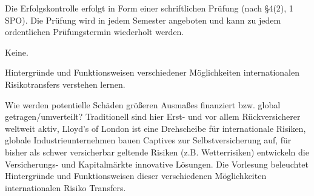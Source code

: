 \begin{course}

\setdoclanguagegerman
{}



\coursehead


\label{cour_5121.dp_997}


\begin{styleenv}
\begin{assessment}
Die Erfolgskontrolle erfolgt in Form einer schriftlichen Prüfung (nach §4(2), 1 SPO). Die Prüfung wird in jedem Semester angeboten und kann zu jedem ordentlichen Prüfungstermin wiederholt werden.


\end{assessment}

\begin{conditions}Keine.\end{conditions}


\end{styleenv}

\begin{learningoutcomes}
Hintergründe und Funktionsweisen verschiedener Möglichkeiten internationalen Risikotransfers verstehen lernen.


\end{learningoutcomes}

\begin{content}
Wie werden potentielle Schäden größeren Ausmaßes finanziert bzw. global getragen/umverteilt? Traditionell sind hier Erst- und vor allem Rückversicherer weltweit aktiv, Lloyd's of London ist eine Drehscheibe für internationale Risiken, globale Industrieunternehmen bauen Captives zur Selbstversicherung auf, für bisher als schwer versicherbar geltende Risiken (z.B. Wetterrisiken) entwickeln die Versicherungs- und Kapitalmärkte innovative Lösungen. Die Vorlesung beleuchtet Hintergründe und Funktionsweisen dieser verschiedenen Möglichkeiten internationalen Risiko Transfers.



\end{content}
\end{course}
